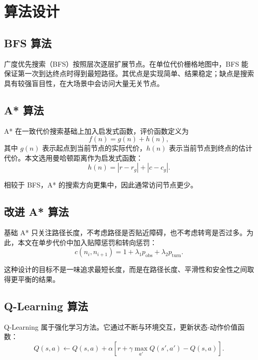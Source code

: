 \chapter{算法设计}\label{chap:algorithm}

\section{BFS 算法}

广度优先搜索（BFS）按照层次逐层扩展节点。在单位代价栅格地图中，BFS 能保证第一次到达终点时得到最短路径。其优点是实现简单、结果稳定；缺点是搜索具有较强盲目性，在大场景中会访问大量无关节点。

\section{A* 算法}

A* 在一致代价搜索基础上加入启发式函数，评价函数定义为
\begin{equation}
  f(n)=g(n)+h(n),
\end{equation}
其中 $g(n)$ 表示起点到当前节点的实际代价，$h(n)$ 表示当前节点到终点的估计代价。本文选用曼哈顿距离作为启发式函数：
\begin{equation}
  h(n)=|r-r_g|+|c-c_g|.
\end{equation}

相较于 BFS，A* 的搜索方向更集中，因此通常访问节点更少。

\section{改进 A* 算法}

基础 A* 只关注路径长度，不考虑路径是否贴近障碍，也不考虑转弯是否过多。为此，本文在单步代价中加入贴障惩罚和转向惩罚：
\begin{equation}
  c(n_i,n_{i+1})=1+\lambda_1 p_{\text{obs}}+\lambda_2 p_{\text{turn}}.
\end{equation}

这种设计的目标不是一味追求最短长度，而是在路径长度、平滑性和安全性之间取得更平衡的结果。

\section{Q-Learning 算法}

Q-Learning 属于强化学习方法。它通过不断与环境交互，更新状态-动作价值函数：
\begin{equation}
  Q(s,a)\leftarrow Q(s,a)+\alpha \left[r+\gamma \max_{a'}Q(s',a')-Q(s,a)\right].
\end{equation}

